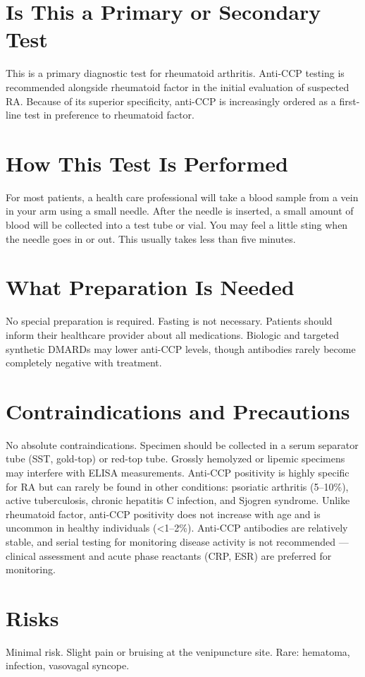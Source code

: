 \section*{Is This a Primary or Secondary Test}
This is a primary diagnostic test for rheumatoid arthritis. Anti-CCP testing is recommended alongside rheumatoid factor in the initial evaluation of suspected RA. Because of its superior specificity, anti-CCP is increasingly ordered as a first-line test in preference to rheumatoid factor.

\section*{How This Test Is Performed}
For most patients, a health care professional will take a blood sample from a vein in your arm using a small needle. After the needle is inserted, a small amount of blood will be collected into a test tube or vial. You may feel a little sting when the needle goes in or out. This usually takes less than five minutes.

\section*{What Preparation Is Needed}
No special preparation is required. Fasting is not necessary. Patients should inform their healthcare provider about all medications. Biologic and targeted synthetic DMARDs may lower anti-CCP levels, though antibodies rarely become completely negative with treatment.

\section*{Contraindications and Precautions}
No absolute contraindications. Specimen should be collected in a serum separator tube (SST, gold-top) or red-top tube. Grossly hemolyzed or lipemic specimens may interfere with ELISA measurements. Anti-CCP positivity is highly specific for RA but can rarely be found in other conditions: psoriatic arthritis (5--10\%), active tuberculosis, chronic hepatitis C infection, and Sjogren syndrome. Unlike rheumatoid factor, anti-CCP positivity does not increase with age and is uncommon in healthy individuals (<1--2\%). Anti-CCP antibodies are relatively stable, and serial testing for monitoring disease activity is not recommended --- clinical assessment and acute phase reactants (CRP, ESR) are preferred for monitoring.

\section*{Risks}
Minimal risk. Slight pain or bruising at the venipuncture site. Rare: hematoma, infection, vasovagal syncope.

